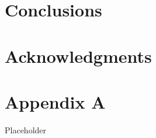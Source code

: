 \documentclass[12pt,oneside]{book}
\begin{document}
%
%
%
%
%
%
%
%
%


\chapter{Conclusions}
\label{chap:Conclusions}

\chapter{Acknowledgments}
\label{chap:Acknowledgments}



\appendix

\chapter{Appendix A}

Placeholder
\end{document}
